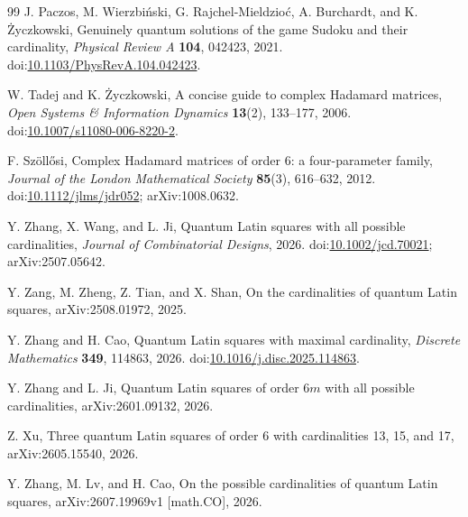 \documentclass[11pt,a4paper]{article}
\begin{document}
\begin{thebibliography}{99}
J. Paczos, M. Wierzbi\'nski, G. Rajchel-Mieldzio\'c, A. Burchardt, and
K. {\.{Z}}yczkowski,
\newblock Genuinely quantum solutions of the game Sudoku and their cardinality,
\newblock \emph{Physical Review A} \textbf{104}, 042423, 2021.
\newblock doi:\href{https://doi.org/10.1103/PhysRevA.104.042423}{10.1103/PhysRevA.104.042423}.

W. Tadej and K. {\.{Z}}yczkowski,
\newblock A concise guide to complex Hadamard matrices,
\newblock \emph{Open Systems \& Information Dynamics} \textbf{13}(2),
133--177, 2006.
\newblock doi:\href{https://doi.org/10.1007/s11080-006-8220-2}{10.1007/s11080-006-8220-2}.

F. Sz\"oll\H{o}si,
\newblock Complex Hadamard matrices of order 6: a four-parameter family,
\newblock \emph{Journal of the London Mathematical Society} \textbf{85}(3),
616--632, 2012.
\newblock doi:\href{https://doi.org/10.1112/jlms/jdr052}{10.1112/jlms/jdr052}; arXiv:1008.0632.

Y. Zhang, X. Wang, and L. Ji,
\newblock Quantum Latin squares with all possible cardinalities,
\newblock \emph{Journal of Combinatorial Designs}, 2026.
\newblock doi:\href{https://doi.org/10.1002/jcd.70021}{10.1002/jcd.70021}; arXiv:2507.05642.

Y. Zang, M. Zheng, Z. Tian, and X. Shan,
\newblock On the cardinalities of quantum Latin squares,
\newblock arXiv:2508.01972, 2025.

Y. Zhang and H. Cao,
\newblock Quantum Latin squares with maximal cardinality,
\newblock \emph{Discrete Mathematics} \textbf{349}, 114863, 2026.
\newblock doi:\href{https://doi.org/10.1016/j.disc.2025.114863}{10.1016/j.disc.2025.114863}.

Y. Zhang and L. Ji,
\newblock Quantum Latin squares of order $6m$ with all possible cardinalities,
\newblock arXiv:2601.09132, 2026.

Z. Xu,
\newblock Three quantum Latin squares of order 6 with cardinalities 13, 15,
and 17,
\newblock arXiv:2605.15540, 2026.

Y. Zhang, M. Lv, and H. Cao,
\newblock On the possible cardinalities of quantum Latin squares,
\newblock arXiv:2607.19969v1 [math.CO], 2026.

\end{thebibliography}
\end{document}
